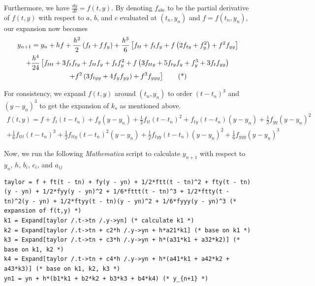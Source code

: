 \documentclass[a4paper]{article}
\begin{document}
Furthermore, we have \(\frac{dy}{dt} = f(t,y)\). By denoting \(f_{abc}\) to be the partial derivative of \(f(t,y)\) with respect to \(a\), \(b\), and \(c\) evaluated at \((t_n, y_n)\) and \(f = f(t_n, y_n)\), our expansion now becomes
\begin{multline*}
  y_{n+1} = y_n + hf + \frac{h^2}{2}\left(f_t + f f_y\right) + \frac{h^3}{6}\left[f_{tt} + f_t f_y + f\left(2f_{ty} + f_y^2\right) + f^2 f_{yy}\right] \\
  + \frac{h^4}{24}\left[f_{ttt} + 3f_t f_{ty} + f_{tt} f_y + f_t f_y^2 + f\left(3f_{tty} + 5f_{ty} f_y + f_y^3 + 3f_t f_{yy}\right)\right.     \\
    \left.+ f^2\left(3f_{tyy} + 4f_y f_{yy}\right) + f^3 f_{yyy}\vphantom{f_y^3}\right] \tag{*}
\end{multline*}

For consistency, we expand \(f(t,y)\) around \((t_n, y_n)\) to order \({(t-t_n)}^3\) and \({(y-y_n)}^3\) to get the expansion of \(k_s\) as mentioned above.
\begin{multline*}
  f(t,y) = f + f_t(t-t_n) + f_y(y-y_n) + \frac{1}{2}f_{tt}{(t-t_n)}^2 + f_{ty}(t-t_n)(y-y_n) + \frac{1}{2}f_{yy}{(y-y_n)}^2                        \\
  + \frac{1}{6}f_{ttt}{(t-t_n)}^3 + \frac{1}{2}f_{tty}{(t-t_n)}^2(y-y_n) + \frac{1}{2}f_{tyy}(t-t_n){(y-y_n)}^2 + \frac{1}{6}f_{yyy}{(y-y_n)}^3
\end{multline*}

Now, we run the following \textit{Mathematica} script to calculate \(y_{n+1}\) with respect to \(y_n\), \(h\), \(b_i\), \(c_i\), and \(a_{ij}\)
\begin{mdframed}[leftline=false,rightline=false,backgroundcolor=magenta!10]
  \begin{verbatim}
taylor = f + ft(t - tn) + fy(y - yn) + 1/2*ftt(t - tn)^2 + fty(t - tn)(y - yn) + 1/2*fyy(y - yn)^2 + 1/6*fttt(t - tn)^3 + 1/2*ftty(t - tn)^2(y - yn) + 1/2*ftyy(t - tn)(y - yn)^2 + 1/6*fyyy(y - yn)^3 (* expansion of f(t,y) *)
k1 = Expand[taylor /.t->tn /.y->yn] (* calculate k1 *)
k2 = Expand[taylor /.t->tn + c2*h /.y->yn + h*a21*k1] (* base on k1 *)
k3 = Expand[taylor /.t->tn + c3*h /.y->yn + h*(a31*k1 + a32*k2)] (* base on k1, k2 *)
k4 = Expand[taylor /.t->tn + c4*h /.y->yn + h*(a41*k1 + a42*k2 + a43*k3)] (* base on k1, k2, k3 *)
yn1 = yn + h*(b1*k1 + b2*k2 + b3*k3 + b4*k4) (* y_{n+1} *)
  \end{verbatim}
\end{mdframed}
\end{document}
